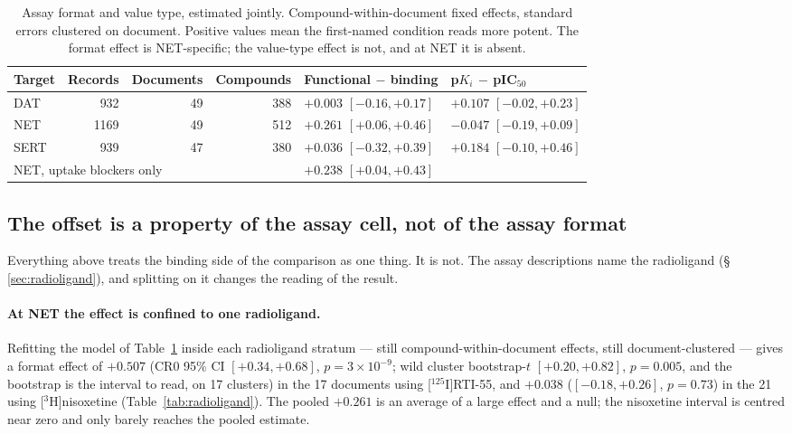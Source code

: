 \documentclass[11pt,a4paper]{article}
\begin{document}
\begin{table}[tb]
\centering
\caption{Assay format and value type, estimated jointly. Compound-within-document fixed
effects, standard errors clustered on document. Positive values mean the first-named
condition reads more potent. The format effect is NET-specific; the value-type effect
is not, and at NET it is absent.}
\label{tab:twobytwo}
\begin{tabular}{lrrrll}
\toprule
Target & Records & Documents & Compounds & Functional $-$ binding & p$K_i$ $-$ pIC$_{50}$ \\
\midrule
DAT  &  932 & 49 & 388 & $+0.003$ $[-0.16,+0.17]$ & $+0.107$ $[-0.02,+0.23]$ \\
NET  & 1169 & 49 & 512 & $\mathbf{+0.261}$ $[+0.06,+0.46]$ & $-0.047$ $[-0.19,+0.09]$ \\
SERT &  939 & 47 & 380 & $+0.036$ $[-0.32,+0.39]$ & $+0.184$ $[-0.10,+0.46]$ \\
\midrule
\multicolumn{4}{l}{NET, uptake blockers only} & $+0.238$ $[+0.04,+0.43]$ & \\
\bottomrule
\end{tabular}
\end{table}

\subsection{The offset is a property of the assay cell, not of the assay format}
\label{sec:radioligand-results}

Everything above treats the binding side of the comparison as one thing. It is not. The
assay descriptions name the radioligand (\S\,\ref{sec:radioligand}), and splitting on it
changes the reading of the result.

\paragraph{At NET the effect is confined to one radioligand.} Refitting the model of
Table~\ref{tab:twobytwo} inside each radioligand stratum --- still compound-within-document
effects, still document-clustered --- gives a format effect of $\mathbf{+0.507}$ (CR0 95\% CI
$[+0.34,+0.68]$, $p=3\times10^{-9}$; wild cluster bootstrap-$t$ $[+0.20,+0.82]$,
$p=0.005$, and the bootstrap is the interval to read, on 17 clusters) in the 17 documents using
[$^{125}$I]RTI-55, and $\mathbf{+0.038}$ ($[-0.18,+0.26]$, $p=0.73$) in the 21 using
[$^{3}$H]nisoxetine (Table~\ref{tab:radioligand}). The pooled $+0.261$ is an average of a
large effect and a null; the nisoxetine interval is centred near zero and only barely
reaches the pooled estimate.
\end{document}
